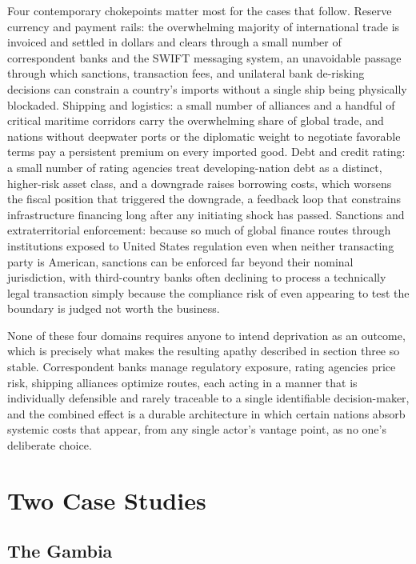 \documentclass[11pt]{article}
\begin{document}
Four contemporary chokepoints matter most for the cases that follow. Reserve currency and payment rails: the overwhelming majority of international trade is invoiced and settled in dollars and clears through a small number of correspondent banks and the SWIFT messaging system, an unavoidable passage through which sanctions, transaction fees, and unilateral bank de-risking decisions can constrain a country's imports without a single ship being physically blockaded. Shipping and logistics: a small number of alliances and a handful of critical maritime corridors carry the overwhelming share of global trade, and nations without deepwater ports or the diplomatic weight to negotiate favorable terms pay a persistent premium on every imported good. Debt and credit rating: a small number of rating agencies treat developing-nation debt as a distinct, higher-risk asset class, and a downgrade raises borrowing costs, which worsens the fiscal position that triggered the downgrade, a feedback loop that constrains infrastructure financing long after any initiating shock has passed. Sanctions and extraterritorial enforcement: because so much of global finance routes through institutions exposed to United States regulation even when neither transacting party is American, sanctions can be enforced far beyond their nominal jurisdiction, with third-country banks often declining to process a technically legal transaction simply because the compliance risk of even appearing to test the boundary is judged not worth the business.

None of these four domains requires anyone to intend deprivation as an outcome, which is precisely what makes the resulting apathy described in section three so stable. Correspondent banks manage regulatory exposure, rating agencies price risk, shipping alliances optimize routes, each acting in a manner that is individually defensible and rarely traceable to a single identifiable decision-maker, and the combined effect is a durable architecture in which certain nations absorb systemic costs that appear, from any single actor's vantage point, as no one's deliberate choice.

\section{Two Case Studies}

\subsection{The Gambia}
\end{document}
